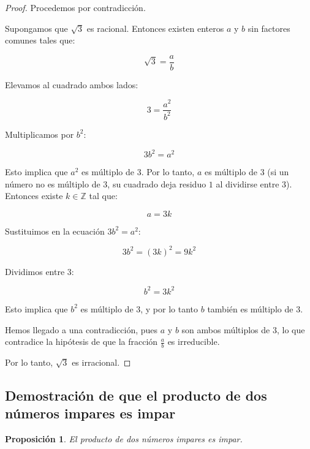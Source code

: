 \documentclass[12pt,final]{report}
\theoremstyle{plain}
\newtheorem{proposition}[theorem]{Proposición}
\theoremstyle{definition}
\begin{document}
\begin{proof}

Procedemos por contradicción.

Supongamos que $\sqrt{3}$ es racional. Entonces existen enteros $a$ y $b$ sin factores comunes tales que:

\[
\sqrt{3} = \frac{a}{b}
\]

Elevamos al cuadrado ambos lados:

\[
3 = \frac{a^2}{b^2}
\]

Multiplicamos por $b^2$:

\[
3b^2 = a^2
\]

Esto implica que $a^2$ es múltiplo de $3$. Por lo tanto, $a$ es múltiplo de $3$ (si un número no es múltiplo de $3$, su cuadrado deja residuo $1$ al dividirse entre $3$). Entonces existe $k \in \mathbb{Z}$ tal que:

\[
a = 3k
\]

Sustituimos en la ecuación $3b^2 = a^2$:

\[
3b^2 = (3k)^2 = 9k^2
\]

Dividimos entre $3$:

\[
b^2 = 3k^2
\]

Esto implica que $b^2$ es múltiplo de $3$, y por lo tanto $b$ también es múltiplo de $3$.

Hemos llegado a una contradicción, pues $a$ y $b$ son ambos múltiplos de $3$, lo que contradice la hipótesis de que la fracción $\frac{a}{b}$ es irreducible.

Por lo tanto, $\sqrt{3}$ es irracional.

\end{proof}

\newpage

\subsection{Demostración de que el producto de dos números impares es impar}

\begin{proposition}
El producto de dos números impares es impar.
\end{proposition}
\end{document}
